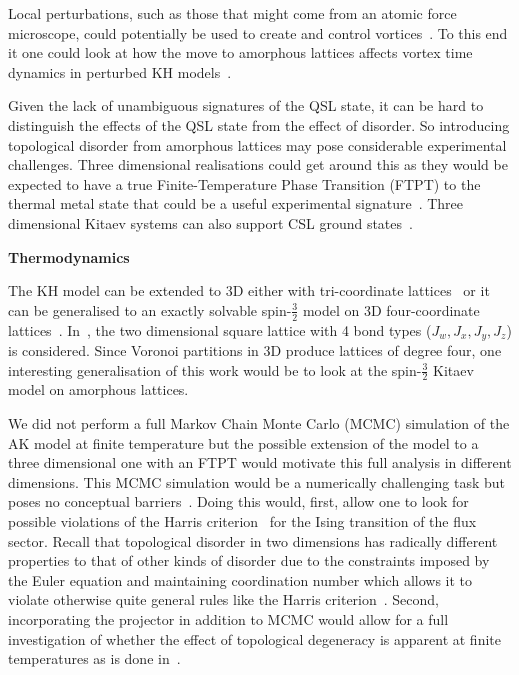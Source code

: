 Local perturbations, such as those that might come from an atomic force microscope, could potentially be used to create and control vortices~\autocite{jangVortexCreationControl2021}. To this end it one could look at how the move to amorphous lattices affects vortex time dynamics in perturbed KH models~\autocite{joyDynamicsVisonsThermal2022}.

Given the lack of unambiguous signatures of the QSL state, it can be hard to distinguish the effects of the QSL state from the effect of disorder. So introducing topological disorder from amorphous lattices may pose considerable experimental challenges. Three dimensional realisations could get around this as they would be expected to have a true Finite-Temperature Phase Transition (FTPT) to the thermal metal state that could be a useful experimental signature~\autocite{eschmannThermodynamicClassificationThreedimensional2020,OBrienPRB2016}. Three dimensional Kitaev systems can also support CSL ground states~\autocite{mishchenkoChiralSpinLiquids2020}.

\textbf{Thermodynamics}

The KH model can be extended to 3D either with tri-coordinate lattices~\autocite{eschmannThermodynamicClassificationThreedimensional2020,OBrienPRB2016} or it can be generalised to an exactly solvable spin-\(\tfrac{3}{2}\) model on 3D four-coordinate lattices~\autocite{yaoAlgebraicSpinLiquid2009,wenQuantumOrderStringnet2003,ryuThreedimensionalTopologicalPhase2009,Baskaran2008,Nussinov2009,Yao2011,Chua2011,Natori2020,Chulliparambil2020,Chulliparambil2021,Seifert2020,WangHaoranPRB2021,Wu2009}. In~\autocite{yaoAlgebraicSpinLiquid2009}, the two dimensional square lattice with 4 bond types (\(J_w, J_x, J_y, J_z\)) is considered. Since Voronoi partitions in 3D produce lattices of degree four, one interesting generalisation of this work would be to look at the spin-\(\tfrac{3}{2}\) Kitaev model on amorphous lattices.

We did not perform a full Markov Chain Monte Carlo (MCMC) simulation of the AK model at finite temperature but the possible extension of the model to a three dimensional one with an FTPT would motivate this full analysis in different dimensions. This MCMC simulation would be a numerically challenging task but poses no conceptual barriers~\autocite{Laumann2012,lahtinenTopologicalLiquidNucleation2012,selfThermallyInducedMetallic2019}. Doing this would, first, allow one to look for possible violations of the Harris criterion~\autocite{harrisEffectRandomDefects1974} for the Ising transition of the flux sector. Recall that topological disorder in two dimensions has radically different properties to that of other kinds of disorder due to the constraints imposed by the Euler equation and maintaining coordination number which allows it to violate otherwise quite general rules like the Harris criterion~\autocite{barghathiPhaseTransitionsRandom2014,schrauthViolationHarrisBarghathiVojtaCriterion2018}. Second, incorporating the projector in addition to MCMC would allow for a full investigation of whether the effect of topological degeneracy is apparent at finite temperatures as is done in~\autocite{selfThermallyInducedMetallic2019}.

